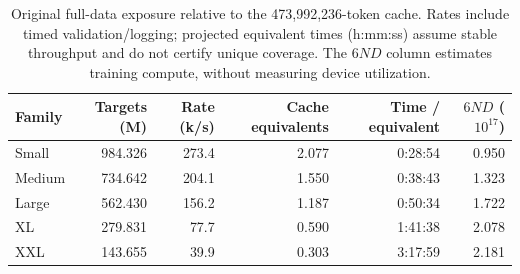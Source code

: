 \begin{table}[t]
\centering\small
\setlength{\tabcolsep}{4pt}
\caption{Original full-data exposure relative to the 473,992,236-token cache. Rates include timed validation/logging; projected equivalent times (h:mm:ss) assume stable throughput and do not certify unique coverage. The $6ND$ column estimates training compute, without measuring device utilization.}
\label{tab:exposure2}
\begin{tabular}{lrrrrr}
\toprule
Family & Targets (M) & Rate (k/s) & Cache equivalents & Time / equivalent & $6ND$ ($10^{17}$)\\
\midrule
Small & 984.326 & 273.4 & 2.077 & 0:28:54 & 0.950\\
Medium & 734.642 & 204.1 & 1.550 & 0:38:43 & 1.323\\
Large & 562.430 & 156.2 & 1.187 & 0:50:34 & 1.722\\
XL & 279.831 & 77.7 & 0.590 & 1:41:38 & 2.078\\
XXL & 143.655 & 39.9 & 0.303 & 3:17:59 & 2.181\\
\bottomrule
\end{tabular}
\end{table}

